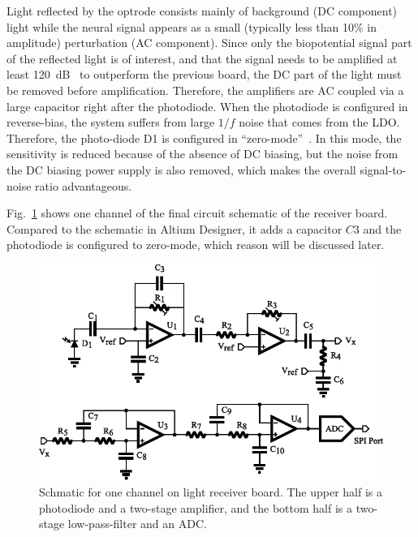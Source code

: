 Light reflected by the optrode consists mainly of background (DC component) light while the neural signal appears as a small (typically less than 10\% in amplitude) perturbation (AC component). Since only the biopotential signal part of the reflected light is of interest, and that the signal needs to be amplified at least \qty{120}{dB\Omega} to outperform the previous board, the DC part of the light must be removed before amplification.  Therefore, the amplifiers are AC coupled via a large capacitor right after the photodiode. When the photodiode is configured in reverse-bias, the system suffers from large $1/f$ noise that comes from the LDO. Therefore, the photo-diode D1 is configured in ``zero-mode''~\cite{zero-mode_detection}.  In this mode, the sensitivity is reduced because of the absence of DC biasing, but the noise from the DC biasing power supply is also removed, which makes the overall signal-to-noise ratio advantageous.

Fig.~\ref{fig_ReceiverSch} shows one channel of the final circuit schematic of the receiver board.  Compared to the schematic in Altium Designer, it adds a capacitor $C3$ and the photodiode is configured to zero-mode, which reason will be discussed later.

\begin{figure}[H]
\centerline{\includegraphics[scale=0.8]{4-ANC_Sys/ReceiverSch.pdf}}
\caption{Schmatic for one channel on light receiver board.  The upper half is a photodiode and a two-stage amplifier, and the bottom half is a two-stage low-pass-filter and an ADC.}
\label{fig_ReceiverSch}
\end{figure}


